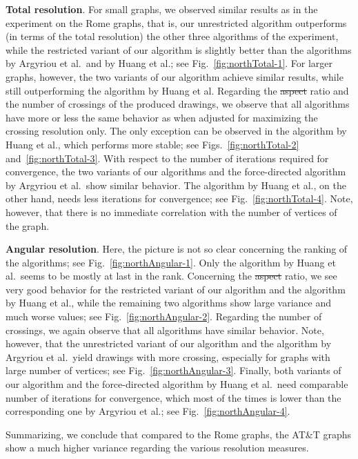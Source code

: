 \documentclass{comjnl}
\newcommand{\myparagraph}[1]{\medskip\noindent\textbf{#1}.}
\providecommand{\DIFaddtex}[1]{{\protect\color{blue}\uwave{#1}}} %
\providecommand{\DIFdeltex}[1]{{\protect\color{red}\sout{#1}}}                      %
\providecommand{\DIFaddbegin}{} %
\providecommand{\DIFaddend}{} %
\providecommand{\DIFdelbegin}{} %
\providecommand{\DIFdelend}{} %
\providecommand{\DIFadd}[1]{\texorpdfstring{\DIFaddtex{#1}}{#1}} %
\providecommand{\DIFdel}[1]{\texorpdfstring{\DIFdeltex{#1}}{}} %
\newcommand{\DIFscaledelfig}{0.5}
\newlength{\DIFdelgraphicswidth} %
\newlength{\DIFdelgraphicsheight} %
\newcommand{\DIFaddincludegraphics}[2][]{{\color{blue}\fbox{\DIFOincludegraphics[#1]{#2}}}} %
\newcommand{\DIFdelincludegraphics}[2][]{%
\sbox{\DIFdelgraphicsbox}{\DIFOincludegraphics[#1]{#2}}%
\settoboxwidth{\DIFdelgraphicswidth}{\DIFdelgraphicsbox} %
\settoboxtotalheight{\DIFdelgraphicsheight}{\DIFdelgraphicsbox} %
\scalebox{\DIFscaledelfig}{%
\parbox[b]{\DIFdelgraphicswidth}{\usebox{\DIFdelgraphicsbox}\\[-\baselineskip] \rule{\DIFdelgraphicswidth}{0em}}\llap{\resizebox{\DIFdelgraphicswidth}{\DIFdelgraphicsheight}{%
\setlength{\unitlength}{\DIFdelgraphicswidth}%
\begin{picture}(1,1)%
\thicklines\linethickness{2pt} %
{\color[rgb]{1,0,0}\put(0,0){\framebox(1,1){}}}%
{\color[rgb]{1,0,0}\put(0,0){\line( 1,1){1}}}%
{\color[rgb]{1,0,0}\put(0,1){\line(1,-1){1}}}%
\end{picture}%
}\hspace*{3pt}}} %
} %
\DeclareRobustCommand{\DIFaddbegin}{\DIFOaddbegin \let\includegraphics\DIFaddincludegraphics} %
\DeclareRobustCommand{\DIFaddend}{\DIFOaddend \let\includegraphics\DIFOincludegraphics} %
\DeclareRobustCommand{\DIFdelbegin}{\DIFOdelbegin \let\includegraphics\DIFdelincludegraphics} %
\DeclareRobustCommand{\DIFdelend}{\DIFOaddend \let\includegraphics\DIFOincludegraphics} %
\begin{document}
\myparagraph{Total resolution} For small graphs, we observed similar results as in the experiment on the Rome graphs, that is, our unrestricted algorithm outperforms (in terms of the total resolution) the other three algorithms of the experiment, while the restricted variant of our algorithm is slightly better than the algorithms by Argyriou et al.\ and by Huang et al.; see Fig.~\ref{fig:northTotal-1}. For larger graphs, however, the two variants of our algorithm achieve similar results, while still outperforming the algorithm by Huang et al. Regarding the \DIFdelbegin \DIFdel{aspect }\DIFdelend \DIFaddbegin \DIFadd{edge-length }\DIFaddend ratio and the number of crossings of the produced drawings, we observe that all algorithms have more or less the same behavior as when adjusted for maximizing the crossing resolution only. The only exception can be observed in the algorithm by Huang et al., which performs more stable; see Figs.~\ref{fig:northTotal-2} and~\ref{fig:northTotal-3}. With respect to the number of iterations required for convergence, the two variants of our algorithms and the force-directed algorithm by Argyriou et al.\ show similar behavior. The algorithm by Huang et al., on the other hand, needs less iterations for convergence; see Fig.~\ref{fig:northTotal-4}. Note, however, that there is no immediate correlation with the number of vertices of the graph.


\myparagraph{Angular resolution} Here, the picture is not so clear concerning the ranking of the algorithms; see Fig.~\ref{fig:northAngular-1}. Only the algorithm by Huang et al.\ seems to be mostly at last in the rank. Concerning the \DIFdelbegin \DIFdel{aspect }\DIFdelend \DIFaddbegin \DIFadd{edge-length }\DIFaddend ratio, we see very good behavior for the restricted variant of our algorithm and the algorithm by Huang et al., while the remaining two algorithms show large variance and much worse values; see Fig.~\ref{fig:northAngular-2}. Regarding the number of crossings, we again observe that all algorithms have similar behavior. Note, however, that the unrestricted variant of our algorithm and the algorithm by Argyriou et al.\ yield drawings with more crossing, especially for graphs with large number of vertices; see Fig.~\ref{fig:northAngular-3}. Finally, both variants of our algorithm and the force-directed algorithm by Huang et al.\ need comparable number of iterations for convergence, which most of the times is lower than the corresponding one by Argyriou et al.; see Fig.~\ref{fig:northAngular-4}.

Summarizing, we conclude that compared to the Rome graphs, the AT\&T graphs show a much higher variance regarding the various resolution measures. %
\end{document}
